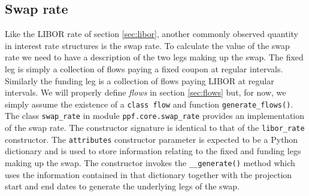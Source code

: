 \subsection{Swap rate}\label{sec:swap-rate}
Like the LIBOR rate of section \ref{sec:libor}, another commonly
observed quantity in interest rate structures is the swap rate. To
calculate the value of the swap rate we need to have a description of
the two legs making up the swap. The fixed leg is simply a collection
of flows paying a fixed coupon at regular intervals. Similarly the
funding leg is a collection of flows paying LIBOR at regular
intervals. We will properly define \emph{flows} in
section \ref{sec:flows} but, for now, we simply assume the existence of a
\verb|class flow| and function \verb|generate_flows()|. 
The class \verb|swap_rate| in module \verb|ppf.core.swap_rate|
provides an implementation of the swap rate. The constructor signature
is identical to that of the \verb|libor_rate| constructor. The
\verb|attributes| constructor parameter is expected to be a Python
dictionary and is used to store information relating to the fixed
and funding legs making up the swap. The constructor invokes the
\verb|__generate()| method which uses the information contained in
that dictionary together with the projection start and end dates to 
generate the underlying legs of the swap.
